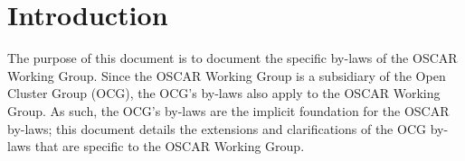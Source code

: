 %
%
%

\section{Introduction}

The purpose of this document is to document the specific by-laws of
the OSCAR Working Group.  Since the OSCAR Working Group is a
subsidiary of the Open Cluster Group (OCG), the OCG's by-laws also
apply to the OSCAR Working Group.  As such, the OCG's by-laws are the
implicit foundation for the OSCAR by-laws; this document details the
extensions and clarifications of the OCG by-laws that are specific to
the OSCAR Working Group.
